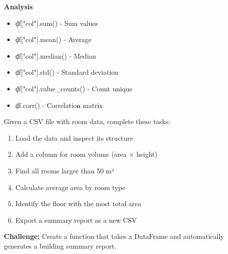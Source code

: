 \begin{tcolorbox}[
    title=Pandas Essential Commands,
    colframe=blue,
    colback=white,
    arc=2mm
]
\textbf{Analysis}
\begin{itemize}
\item \c{df["col"].sum()} - Sum values
\item \c{df["col"].mean()} - Average
\item \c{df["col"].median()} - Median
\item \c{df["col"].std()} - Standard deviation
\item \c{df["col"].value_counts()} - Count unique
\item \c{df.corr()} - Correlation matrix
\end{itemize}
\end{tcolorbox}



\begin{tcolorbox}[
    title=Exercise 1: Room Schedule Analysis,
    colframe=purple,
    colback=white,
    arc=2mm
]
Given a CSV file with room data, complete these tasks:
\begin{enumerate}
\item Load the data and inspect its structure
\item Add a column for room volume (area × height)
\item Find all rooms larger than 50 m²
\item Calculate average area by room type
\item Identify the floor with the most total area
\item Export a summary report as a new CSV
\end{enumerate}

\textbf{Challenge:} Create a function that takes a DataFrame and automatically generates a building summary report.
\end{tcolorbox}

